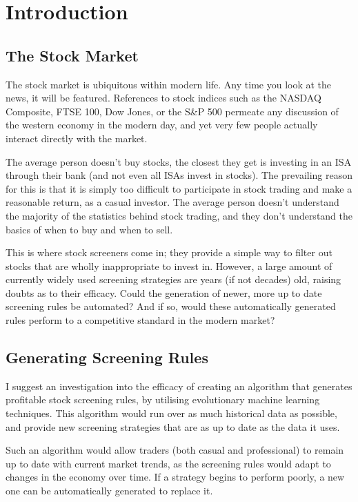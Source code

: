 \section{Introduction}
\subsection{The Stock Market}
The stock market is ubiquitous within modern life. Any time you look at the news, it will be featured. References to stock indices such as the NASDAQ Composite, FTSE 100, Dow Jones, or the S\&P 500 permeate any discussion of the western economy in the modern day, and yet very few people actually interact directly with the market. \newline

The average person doesn’t buy stocks, the closest they get is investing in an ISA through their bank (and not even all ISAs invest in stocks). The prevailing reason for this is that it is simply too difficult to participate in  stock trading and make a reasonable return, as a casual investor. The average person doesn’t understand the majority of the statistics behind stock trading, and they don't understand the basics of when to buy and when to sell. \newline

This is where stock screeners come in; they provide a simple way to filter out stocks that are wholly inappropriate to invest in. However, a large amount of currently widely used screening strategies are years (if not decades) old, raising doubts as to their efficacy. Could the generation of newer, more up to date screening rules be automated? And if so, would these automatically generated rules perform to a competitive standard in the modern market?

\subsection{Generating Screening Rules}
I suggest an investigation into the efficacy of creating an algorithm that generates profitable stock screening rules, by utilising evolutionary machine learning techniques. This algorithm would run over as much historical data as possible, and provide new screening strategies that are as up to date as the data it uses. \newline

Such an algorithm would allow traders (both casual and professional) to remain up to date with current market trends, as the screening rules would adapt to changes in the economy over time. If a strategy begins to perform poorly, a new one can be automatically generated to replace it.


